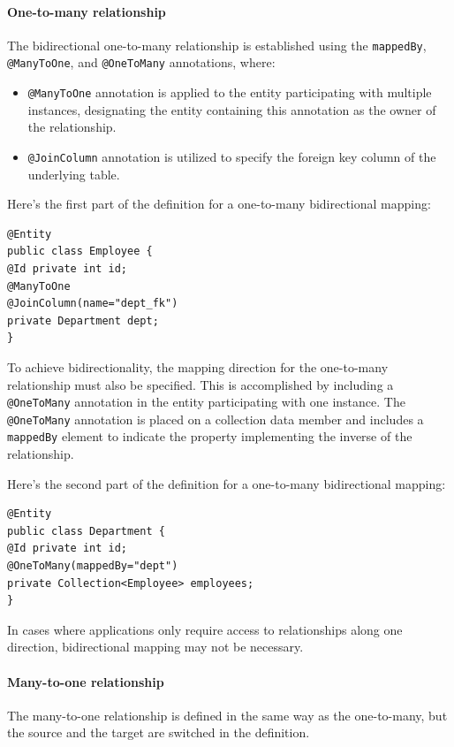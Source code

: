 \paragraph*{One-to-many relationship}
The bidirectional one-to-many relationship is established using the \texttt{mappedBy}, \texttt{@ManyToOne}, and \texttt{@OneToMany} annotations, where:
\begin{itemize}
    \item \texttt{@ManyToOne} annotation is applied to the entity participating with multiple instances, designating the entity containing this annotation as the owner of the relationship.
    \item \texttt{@JoinColumn} annotation is utilized to specify the foreign key column of the underlying table.
\end{itemize}
\begin{example}
    Here's the first part of the definition for a one-to-many bidirectional mapping:
    \begin{lstlisting}[style=Java]
@Entity
public class Employee {
@Id private int id;
@ManyToOne
@JoinColumn(name="dept_fk")
private Department dept;
}
    \end{lstlisting}
\end{example}
To achieve bidirectionality, the mapping direction for the one-to-many relationship must also be specified.
This is accomplished by including a \texttt{@OneToMany} annotation in the entity participating with one instance.
The \texttt{@OneToMany} annotation is placed on a collection data member and includes a \texttt{mappedBy} element to indicate the property implementing the inverse of the relationship.
\begin{example}
    Here's the second part of the definition for a one-to-many bidirectional mapping:
    \begin{lstlisting}[style=Java]
@Entity
public class Department {
@Id private int id;
@OneToMany(mappedBy="dept")
private Collection<Employee> employees;
}
    \end{lstlisting}
\end{example}
In cases where applications only require access to relationships along one direction, bidirectional mapping may not be necessary.

\paragraph*{Many-to-one relationship}
The many-to-one relationship is defined in the same way as the one-to-many, but the source and the target are switched in the definition. 

